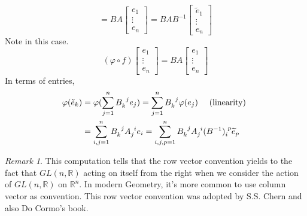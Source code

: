\documentclass[UTF8,oneside,11pt]{book}
\theoremstyle{plain}\newtheorem{thm}{Theorem}
\theoremstyle{definition}\newtheorem{defn}[thm]{Definition}
\theoremstyle{plain}\newtheorem{axiom}[thm]{Axiom}
\theoremstyle{plain}\newtheorem{coro}[thm]{Corollary}
\theoremstyle{plain}\newtheorem{lemma}[thm]{Lemma}
\theoremstyle{plain}\newtheorem{prop}[thm]{Proposition}
\theoremstyle{plain}\newtheorem{conj}[thm]{Conjecture}
\theoremstyle{plain}\newtheorem{ques}[thm]{Problem}
\theoremstyle{plain}\newtheorem{const}[thm]{Construction}
\theoremstyle{remark}\newtheorem{notation}[thm]{Notation}
\theoremstyle{plain}\newtheorem*{app}{Application}
\theoremstyle{plain}\newtheorem*{exam}{Example}
\theoremstyle{plain}\newtheorem*{exer}{Exercise}
\theoremstyle{remark}\newtheorem*{remark}{Remark}
\theoremstyle{remark}\newtheorem*{note}{\small{Note}}
\numberwithin{equation}{section}
\numberwithin{thm}{section}
\begin{document}
\[
    =B A\left[\begin{array}{c}
    e_1 \\
    \vdots \\
    e_n
    \end{array}\right]=B A B^{-1}\left[\begin{array}{c}
    \tilde{e}_1 \\
    \vdots \\
    e_n
    \end{array}\right]
\]
Note in this case.
\[
(\varphi \circ f)\left[\begin{array}{c}
e_1 \\
\vdots \\
e_n
\end{array}\right]=B A\left[\begin{array}{c}
e_1 \\
\vdots \\
e_n
\end{array}\right]
\]
In terms of entries,
\begin{align*}
    \varphi(\tilde{e}_k) &=\varphi(\sum_{j=1}^n B\indices{_k^j} e_j)=\sum_{j=1}^n B\indices{_k^j} \varphi(e_j) \quad \text { (linearity) } \\
    &=\sum_{i, j=1}^n B\indices{_k^j} A\indices{_j^i} e_i=\sum_{i,j,p=1}^n B\indices{_k^j} A\indices{_j^i}(B^{-1})\indices{_i^p} \widetilde{e}_p
\end{align*}
\begin{remark}
    This computation tells that the row vector convention yields to the fact that $GL(n,\mathbb{R})$ acting on itself from the right when we consider the action of $GL(n, \mathbb{R})$ on $\mathbb{R}^n$.
    In modern Geometry, it's more common to use column vector as convention. This row vector convention was adopted by S.S. Chern and also Do Cormo's book.
\end{remark}
\end{document}
